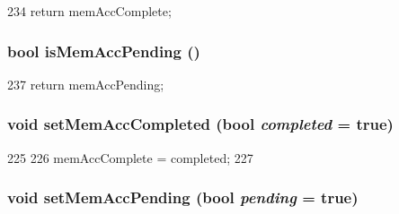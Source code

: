 \begin{DoxyCode}
234 { return memAccComplete; }
\end{DoxyCode}
\hypertarget{classCacheRequest_a4cde89a6a447d3a380be174fd290160c}{
\subsubsection[{isMemAccPending}]{\setlength{\rightskip}{0pt plus 5cm}bool isMemAccPending ()}}
\label{classCacheRequest_a4cde89a6a447d3a380be174fd290160c}



\begin{DoxyCode}
237 { return memAccPending; }
\end{DoxyCode}
\hypertarget{classCacheRequest_af0fe97a3ad40ede3efefabb5963b90b1}{
\subsubsection[{setMemAccCompleted}]{\setlength{\rightskip}{0pt plus 5cm}void setMemAccCompleted (bool {\em completed} = {\ttfamily true})}}
\label{classCacheRequest_af0fe97a3ad40ede3efefabb5963b90b1}



\begin{DoxyCode}
225     {
226         memAccComplete = completed;
227     }
\end{DoxyCode}
\hypertarget{classCacheRequest_ac72925124571fd902778ad38f1606a88}{
\subsubsection[{setMemAccPending}]{\setlength{\rightskip}{0pt plus 5cm}void setMemAccPending (bool {\em pending} = {\ttfamily true})}}
\label{classCacheRequest_ac72925124571fd902778ad38f1606a88}



